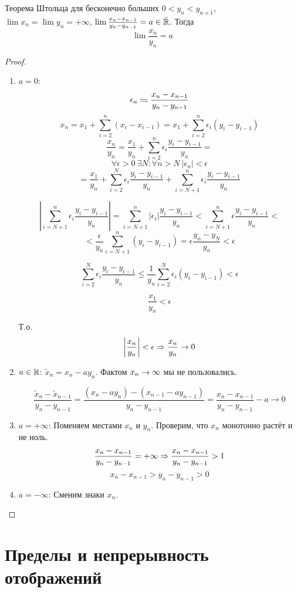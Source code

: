 \begin{theorem}{Теорема Штольца для бесконечно больших}
$0<y_n<y_{n+1}$, $\lim x_n = \lim y_n = +\infty$, $\lim \frac{x_n-x_{n-1}}{y_n-y_{n-1}} = a \in \bar{\mathbb{R}}$.
Тогда 
$$\lim \frac{x_n}{y_n} = a$$
\end{theorem}
\begin{proof}
\begin{enumerate}
\item $a = 0$:
$$\epsilon_n \leftrightharpoons \frac{x_n - x_{n-1}}{y_n - y_{n-1}}$$
$$x_n = x_1 + \sum_{i=2}^n (x_i - x_{i-1}) = x_1 + \sum_{i=2}^n \epsilon_i(y_i - y_{i-1})$$
$$\frac{x_n}{y_n} = \frac{x_1}{y_n} + \sum_{i=2}^n \epsilon_i \frac{y_i - y_{i-1}}{y_n} = $$
$$\forall \epsilon > 0\: \exists N\colon \forall n > N\: |\epsilon_n| < \epsilon$$
$$= \frac{x_1}{y_n} + \sum_{i=2}^N \epsilon_i \frac{y_i - y_{i-1}}{y_n} + \sum_{i=N+1}^n \epsilon_i \frac{y_i - y_{i-1}}{y_n}$$

$$\left|\sum_{i=N+1}^n \epsilon_i \frac{y_i - y_{i-1}}{y_n}\right| = \sum_{i=N+1}^n |\epsilon_i| \frac{y_i - y_{i-1}}{y_n} < 
\sum_{i=N+1}^n \epsilon \frac{y_i - y_{i-1}}{y_n} <$$
$$< \frac{\epsilon}{y_n}\sum_{i=N+1}^n (y_i - y_{i-1}) = \epsilon \frac{y_n - y_N}{y_n} < \epsilon$$

$$\sum_{i=2}^N \epsilon_i \frac{y_i - y_{i-1}}{y_n} \leqslant \frac{1}{y_n}\sum_{i=2}^N \epsilon_i(y_i - y_{i-1}) < \epsilon$$

$$\frac{x_1}{y_n} < \epsilon$$

Т.о.
$$\left|\frac{x_n}{y_n}\right| < \epsilon \Rightarrow \frac{x_n}{y_n} \rightarrow 0$$

\item $a\in\mathbb{R}$:
$\tilde x_n = x_n - a y_n$. Фактом $x_n\rightarrow\infty$ мы не пользовались.

$$\frac{\tilde x_n - \tilde x_{n - 1}}{y_n - y_{n - 1}} = \frac{(x_n - ay_n) - (x_{n - 1} - ay_{n - 1})}{y_n - y_{n - 1}} = \frac{x_n - x_{n - 1}}{y_n - y_{n - 1}} - a \to 0$$

\item $a=+\infty$: Поменяем местами $x_n$ и $y_n$. Проверим, что $x_n$ монотонно растёт и не ноль.
$$\frac{x_n - x_{n-1}}{y_n - y_{n-1}} = +\infty \Rightarrow \frac{x_n - x_{n-1}}{y_n - y_{n-1}} > 1$$
$$x_n - x_{n-1} > y_n - y_{n-1} > 0$$

\item $a=-\infty$: Сменим знаки $x_n$.
\end{enumerate}
\end{proof}

\chapter{Пределы и непрерывность отображений}

